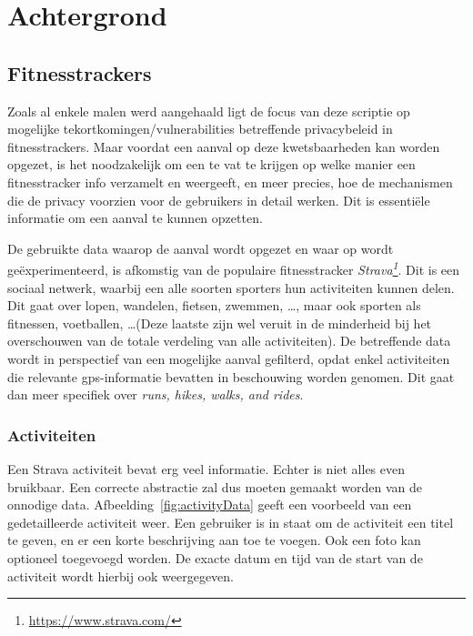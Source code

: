 
\chapter{Achtergrond}

\section{Fitnesstrackers}
Zoals al enkele malen werd aangehaald ligt de focus van deze scriptie op
mogelijke tekortkomingen/vulnerabilities betreffende privacybeleid in
fitnesstrackers. Maar voordat een aanval op deze kwetsbaarheden kan worden
opgezet, is het noodzakelijk om een te vat te krijgen op welke manier een
fitnesstracker info verzamelt en weergeeft, en meer precies, hoe de mechanismen
die de privacy voorzien voor de gebruikers in detail werken. Dit is essentiële
informatie om een aanval te kunnen opzetten.

De gebruikte data waarop de aanval wordt opgezet en waar op wordt
geëxperimenteerd, is afkomstig van de populaire fitnesstracker
\textit{Strava\footnote{\url{https://www.strava.com/}}}. Dit is een sociaal
netwerk, waarbij een alle soorten sporters hun activiteiten kunnen delen. Dit
gaat over lopen, wandelen, fietsen, zwemmen, \ldots, maar ook sporten als
fitnessen, voetballen, \ldots (Deze laatste zijn wel veruit in de minderheid
bij het overschouwen van de totale verdeling van alle
activiteiten\cite{Stravas24:online}). De betreffende data wordt in perspectief
van een mogelijke aanval gefilterd, opdat enkel activiteiten die relevante
gps-informatie bevatten in beschouwing worden genomen. Dit gaat dan meer
specifiek over \textit{runs, hikes, walks, and rides}.

\subsection{Activiteiten}\label{data}
Een Strava activiteit bevat erg veel informatie. Echter is niet alles even
bruikbaar. Een correcte abstractie zal dus moeten gemaakt worden van de
onnodige data. Afbeelding~\ref{fig:activityData} geeft een voorbeeld van een
gedetailleerde activiteit weer. Een gebruiker is in staat om de activiteit een
titel te geven, en er een korte beschrijving aan toe te voegen. Ook een foto
kan optioneel toegevoegd worden. De exacte datum en tijd van de start van de
activiteit wordt hierbij ook weergegeven.

